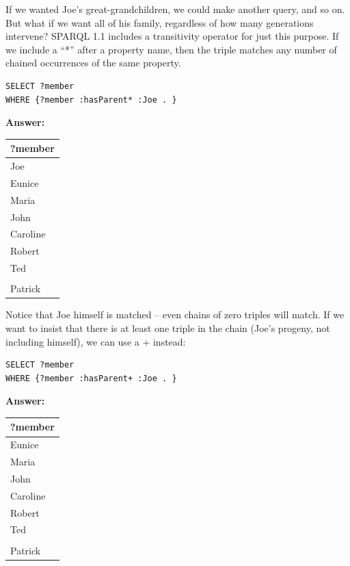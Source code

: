 If we wanted Joe's great-grandchildren, we could make another query, and
so on. But what if we want all of his family, regardless of how many
generations intervene? SPARQL 1.1 includes a transitivity operator for
just this purpose. If we include a ``*'' after a property name, then the
triple matches any number of chained occurrences of the same property.


\begin{lstlisting}
SELECT ?member
WHERE {?member :hasParent* :Joe . }
\end{lstlisting}

\textbf{\textbf{Answer:}}

\begin{tabular}{|l|}
\hline
?member\\
\hline
Joe\\
Eunice\\
Maria\\
John\\
Caroline\\
Robert\\
Ted\\
\\
Patrick\\
\hline
\end{tabular}


Notice that Joe himself is matched -- even chains of zero triples will
match. If we want to insist that there is at least one triple in the
chain (Joe's progeny, not including himself), we can use a + instead:


\begin{lstlisting}
SELECT ?member
WHERE {?member :hasParent+ :Joe . }
\end{lstlisting}

\textbf{\textbf{Answer:}}

\begin{tabular}{|l|}
\hline
?member\\
\hline
Eunice\\
Maria\\
John\\
Caroline\\
Robert\\
Ted\\
\\
Patrick\\
\hline
\end{tabular}

